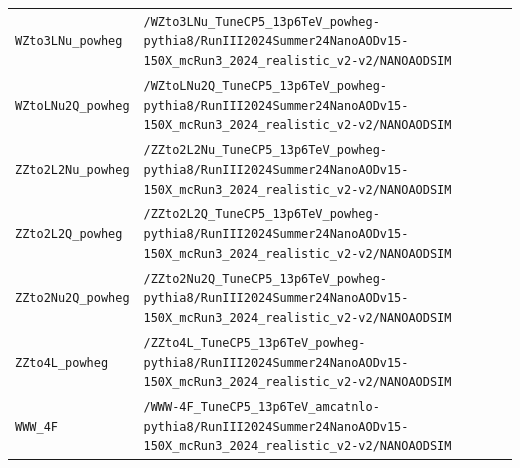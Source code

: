 \begin{longtable}{@{}>{\RaggedRight\arraybackslash}p{} >{\RaggedRight\arraybackslash}p{}@{}}
\addlinespace[2pt]
\texttt{WZto3LNu\_\allowbreak{}powheg} & \texttt{/\allowbreak{}WZto3LNu\_\allowbreak{}TuneCP5\_\allowbreak{}13p6TeV\_\allowbreak{}powheg-\allowbreak{}pythia8/\allowbreak{}RunIII2024Summer24NanoAODv15-\allowbreak{}150X\_\allowbreak{}mcRun3\_\allowbreak{}2024\_\allowbreak{}realistic\_\allowbreak{}v2-\allowbreak{}v2/\allowbreak{}NANOAODSIM} \\
\addlinespace[2pt]
\texttt{WZtoLNu2Q\_\allowbreak{}powheg} & \texttt{/\allowbreak{}WZtoLNu2Q\_\allowbreak{}TuneCP5\_\allowbreak{}13p6TeV\_\allowbreak{}powheg-\allowbreak{}pythia8/\allowbreak{}RunIII2024Summer24NanoAODv15-\allowbreak{}150X\_\allowbreak{}mcRun3\_\allowbreak{}2024\_\allowbreak{}realistic\_\allowbreak{}v2-\allowbreak{}v2/\allowbreak{}NANOAODSIM} \\
\addlinespace[2pt]
\texttt{ZZto2L2Nu\_\allowbreak{}powheg} & \texttt{/\allowbreak{}ZZto2L2Nu\_\allowbreak{}TuneCP5\_\allowbreak{}13p6TeV\_\allowbreak{}powheg-\allowbreak{}pythia8/\allowbreak{}RunIII2024Summer24NanoAODv15-\allowbreak{}150X\_\allowbreak{}mcRun3\_\allowbreak{}2024\_\allowbreak{}realistic\_\allowbreak{}v2-\allowbreak{}v2/\allowbreak{}NANOAODSIM} \\
\addlinespace[2pt]
\texttt{ZZto2L2Q\_\allowbreak{}powheg} & \texttt{/\allowbreak{}ZZto2L2Q\_\allowbreak{}TuneCP5\_\allowbreak{}13p6TeV\_\allowbreak{}powheg-\allowbreak{}pythia8/\allowbreak{}RunIII2024Summer24NanoAODv15-\allowbreak{}150X\_\allowbreak{}mcRun3\_\allowbreak{}2024\_\allowbreak{}realistic\_\allowbreak{}v2-\allowbreak{}v2/\allowbreak{}NANOAODSIM} \\
\addlinespace[2pt]
\texttt{ZZto2Nu2Q\_\allowbreak{}powheg} & \texttt{/\allowbreak{}ZZto2Nu2Q\_\allowbreak{}TuneCP5\_\allowbreak{}13p6TeV\_\allowbreak{}powheg-\allowbreak{}pythia8/\allowbreak{}RunIII2024Summer24NanoAODv15-\allowbreak{}150X\_\allowbreak{}mcRun3\_\allowbreak{}2024\_\allowbreak{}realistic\_\allowbreak{}v2-\allowbreak{}v2/\allowbreak{}NANOAODSIM} \\
\addlinespace[2pt]
\texttt{ZZto4L\_\allowbreak{}powheg} & \texttt{/\allowbreak{}ZZto4L\_\allowbreak{}TuneCP5\_\allowbreak{}13p6TeV\_\allowbreak{}powheg-\allowbreak{}pythia8/\allowbreak{}RunIII2024Summer24NanoAODv15-\allowbreak{}150X\_\allowbreak{}mcRun3\_\allowbreak{}2024\_\allowbreak{}realistic\_\allowbreak{}v2-\allowbreak{}v2/\allowbreak{}NANOAODSIM} \\
\addlinespace[2pt]
\texttt{WWW\_\allowbreak{}4F} & \texttt{/\allowbreak{}WWW-\allowbreak{}4F\_\allowbreak{}TuneCP5\_\allowbreak{}13p6TeV\_\allowbreak{}amcatnlo-\allowbreak{}pythia8/\allowbreak{}RunIII2024Summer24NanoAODv15-\allowbreak{}150X\_\allowbreak{}mcRun3\_\allowbreak{}2024\_\allowbreak{}realistic\_\allowbreak{}v2-\allowbreak{}v2/\allowbreak{}NANOAODSIM} \\

\end{longtable}
